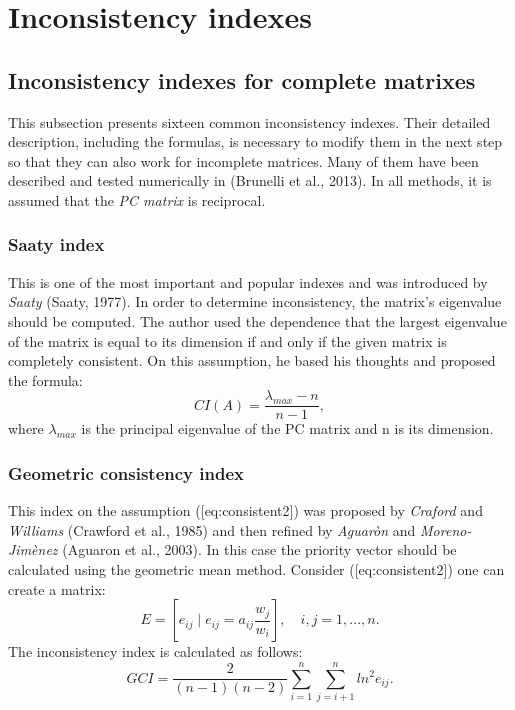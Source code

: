 \chapter{Inconsistency indexes}
\label{sec:inconsistencyIndexes}
\section{Inconsistency indexes for complete matrixes}

This subsection presents sixteen common inconsistency indexes. Their detailed description, including the formulas, is necessary to modify them in the next step so that they can also work for incomplete matrices. Many of them have been described and tested numerically in (Brunelli et al., 2013). In all methods, it is assumed that the \textit{PC matrix} is reciprocal.


 \subsection{Saaty index}

This is one of the most important and popular indexes and was introduced by \textit{Saaty} (Saaty, 1977). In order to determine inconsistency, the matrix's eigenvalue should be computed. The author used the dependence that the largest eigenvalue of the matrix is equal to its dimension if and only if the given matrix is completely consistent. On this assumption, he based his thoughts and proposed the formula:
	\begin{equation} 
		CI(A)=\frac{\lambda_{max}-n}{n-1},
	 \end{equation}
 where $\lambda_{max}$
  is the principal eigenvalue of the PC matrix and n
  is its dimension.


\subsection{Geometric consistency index}

This index on the assumption ([eq:consistent2]) was proposed by \textit{Craford} and \textit{Williams} (Crawford et al., 1985) and then refined by \textit{Aguaròn} and \textit{Moreno-Jimènez} (Aguaron et al., 2003). In this case the priority vector should be calculated using the geometric mean method. Consider ([eq:consistent2]) one can create a matrix:
	\begin{equation} 
		E=\left[e_{ij}\mid e_{ij}=a_{ij}\frac{w_{j}}{w_{i}}\right],\,\,\,\,\,\,i,j=1,...,n.
	 \end{equation}
 The inconsistency index is calculated as follows:
 	\begin{equation} 
		GCI=\frac{2}{(n-1)(n-2)}\sum_{i=1}^{n}\sum_{j=i+1}^{n}ln^{2}e_{ij}.
	 \end{equation}
 

